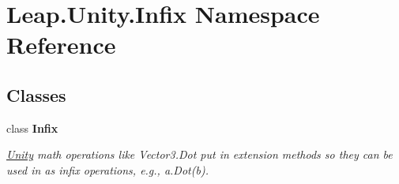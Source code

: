 \hypertarget{namespace_leap_1_1_unity_1_1_infix}{}\section{Leap.\+Unity.\+Infix Namespace Reference}
\label{namespace_leap_1_1_unity_1_1_infix}
\subsection*{Classes}
\begin{DoxyCompactItemize}
\item 
class {\bfseries Infix}
\begin{DoxyCompactList}\small\item\em \mbox{\hyperlink{namespace_leap_1_1_unity}{Unity}} math operations like Vector3.\+Dot put in extension methods so they can be used in as infix operations, e.\+g., a.\+Dot(b). \end{DoxyCompactList}\end{DoxyCompactItemize}

